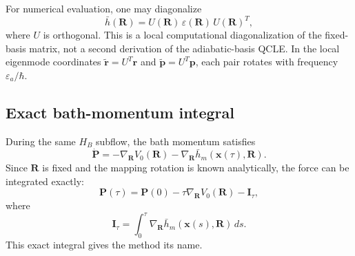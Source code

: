 \documentclass[
  11pt,
  letterpaper,
  onehalfspacing,
  normalmargins,
  equalmargins,
  oneside
]{ut-thesis}
\begin{document}
For numerical evaluation, one may diagonalize
\begin{equation}
\bar h(\mathbf R)
=
U(\mathbf R)\,\varepsilon(\mathbf R)\,U(\mathbf R)^T,
\label{eq:ch5-local-diagonalization}
\end{equation}
where \(U\) is orthogonal. This is a local computational diagonalization of
the fixed-basis matrix, not a second derivation of the adiabatic-basis QCLE.
In the local eigenmode coordinates
\(\widetilde{\mathbf r}=U^T\mathbf r\) and
\(\widetilde{\mathbf p}=U^T\mathbf p\), each pair rotates with frequency
\(\varepsilon_a/\hbar\).


\subsection{Exact bath-momentum integral}
\label{subsec:ch5-momentum-integral}

During the same \(H_B\) subflow, the bath momentum satisfies
\begin{equation}
\dot{\mathbf P}
=
-\nabla_{\mathbf R}V_0(\mathbf R)
-
\nabla_{\mathbf R}\bar h_m(\mathbf x(\tau),\mathbf R).
\label{eq:ch5-B-P-ode}
\end{equation}
Since \(\mathbf R\) is fixed and the mapping rotation is known analytically,
the force can be integrated exactly:
\begin{equation}
\mathbf P(\tau)
=
\mathbf P(0)
-
\tau\nabla_{\mathbf R}V_0(\mathbf R)
-
\mathbf I_\tau,
\label{eq:ch5-B-P-update}
\end{equation}
where
\begin{equation}
\mathbf I_\tau
=
\int_0^\tau
\nabla_{\mathbf R}\bar h_m
\left(\mathbf x(s),\mathbf R\right)\,ds.
\label{eq:ch5-momentum-integral}
\end{equation}
This exact integral gives the method its name.
\end{document}

